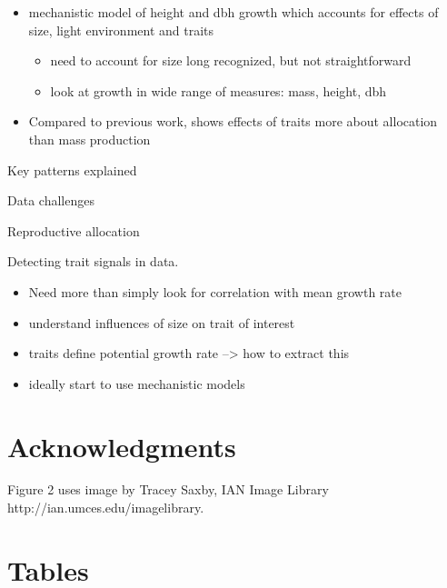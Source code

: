 \documentclass[a4paper,11pt]{article}
\begin{document}
\begin{itemize}
\itemsep1pt\parskip0pt
\item
  mechanistic model of height and dbh growth which accounts for effects
  of size, light environment and traits

  \begin{itemize}
  \itemsep1pt\parskip0pt
  \item
    need to account for size long recognized, but not straightforward
  \item
    look at growth in wide range of measures: mass, height, dbh
  \end{itemize}
\item
  Compared to previous work, shows effects of traits more about
  allocation than mass production
\end{itemize}


Key patterns explained

Data challenges

Reproductive allocation



Detecting trait signals in data.

\begin{itemize}
\item  Need more than simply look for correlation with mean growth rate
\item
  understand influences of size on trait of interest
\item
  traits define potential growth rate --\textgreater{} how to extract
  this
\item
  ideally start to use mechanistic models
\end{itemize}


\section{Acknowledgments}

Figure 2 uses image by Tracey Saxby, IAN Image Library http://ian.umces.edu/imagelibrary.

\newpage



\newpage

\section{Tables}\label{tables}
\end{document}
